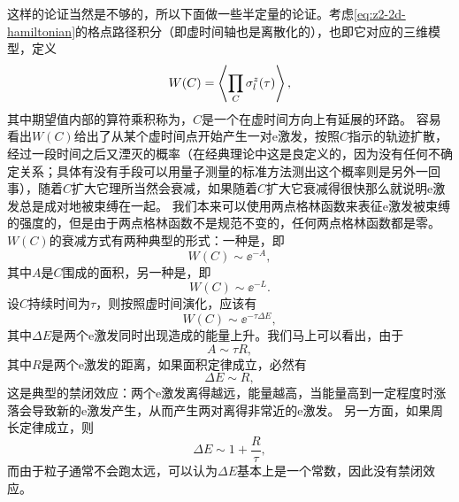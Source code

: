 这样的论证当然是不够的，所以下面做一些半定量的论证。考虑\eqref{eq:z2-2d-hamiltonian}的格点路径积分（即虚时间轴也是离散化的），也即它对应的三维模型，定义
\begin{equation}
    W(C) = \expval{\prod_C \sigma^z_l(\tau)},
\end{equation}
其中期望值内部的算符乘积称为，$C$是一个在虚时间方向上有延展的环路。
容易看出$W(C)$给出了从某个虚时间点开始产生一对e激发，按照$C$指示的轨迹扩散，经过一段时间之后又湮灭的概率（在经典理论中这是良定义的，因为没有任何不确定关系；具体有没有手段可以用量子测量的标准方法测出这个概率则是另外一回事），随着$C$扩大它理所当然会衰减，如果随着$C$扩大它衰减得很快那么就说明e激发总是成对地被束缚在一起。
我们本来可以使用两点格林函数来表征e激发被束缚的强度的，但是由于两点格林函数不是规范不变的，任何两点格林函数都是零。
$W(C)$的衰减方式有两种典型的形式：一种是，即
\begin{equation}
    W(C) \sim \ee^{-A},
\end{equation}
其中$A$是$C$围成的面积，另一种是，即
\begin{equation}
    W(C) \sim \ee^{-L}.
\end{equation}
设$C$持续时间为$\tau$，则按照虚时间演化，应该有
\[
    W(C) \sim \ee^{-\tau \Delta E},
\]
其中$\Delta E$是两个e激发同时出现造成的能量上升。我们马上可以看出，由于
\[
    A \sim \tau R,
\]
其中$R$是两个e激发的距离，如果面积定律成立，必然有
\[
    \Delta E \sim R,
\]
这是典型的禁闭效应：两个e激发离得越远，能量越高，当能量高到一定程度时涨落会导致新的e激发产生，从而产生两对离得非常近的e激发。
另一方面，如果周长定律成立，则
\[
    \Delta E \sim 1 + \frac{R}{\tau},
\]
而由于粒子通常不会跑太远，可以认为$\Delta E$基本上是一个常数，因此没有禁闭效应。

